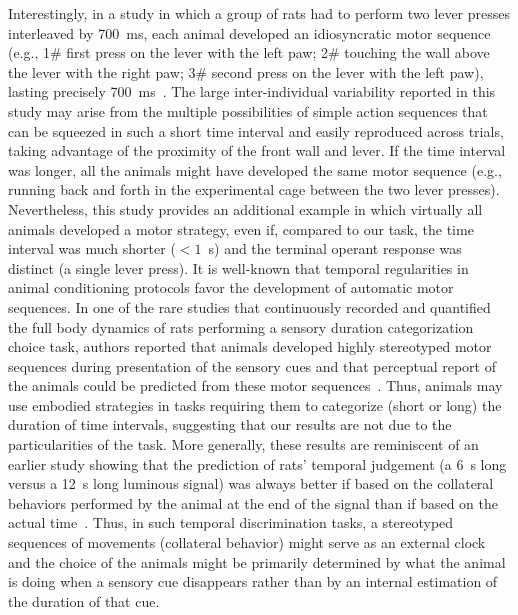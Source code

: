 Interestingly, in a study in which a group of rats had to perform two lever presses interleaved by 700~ms, each animal developed an idiosyncratic motor sequence (e.g., 1\# first press on the lever with the left paw; 2\# touching the wall above the lever with the right paw; 3\# second press on the lever with the left paw), lasting precisely 700~ms~\cite{Kawai2015}.
The large inter-individual variability reported in this study may arise from the multiple possibilities of simple action sequences that can be squeezed in such a short time interval and easily reproduced across trials, taking advantage of the proximity of the front wall and lever.
If the time interval was longer, all the animals might have developed the same motor sequence (e.g., running back and forth in the experimental cage between the two lever presses).
Nevertheless, this study provides an additional example in which virtually all animals developed a motor strategy, even if, compared to our task, the time interval was much shorter ($< 1$~s) and the terminal operant response was distinct (a single lever press).
It is well-known that temporal regularities in animal conditioning protocols favor the development of automatic motor sequences.
In one of the rare studies that continuously recorded and quantified the full body dynamics of rats performing a sensory duration categorization choice task, authors reported that animals developed highly stereotyped motor sequences during presentation of the sensory cues and that perceptual report of the animals could be predicted from these motor sequences~\cite{Gouvea2014}.
Thus, animals may use embodied strategies in tasks requiring them to categorize (short or long) the duration of time intervals, suggesting that our results are not due to the particularities of the task.
More generally, these results are reminiscent of an earlier study showing that the prediction of rats' temporal judgement (a 6~s long versus a 12~s long luminous signal) was always better if based on the collateral behaviors performed by the animal at the end of the signal than if based on the actual time~\cite{Fetterman1998BehProc}.
Thus, in such temporal discrimination tasks, a stereotyped sequences of movements (collateral behavior) might serve as an external clock and the choice of the animals might be primarily determined by what the animal is doing when a sensory cue disappears rather than by an internal estimation of the duration of that cue.

